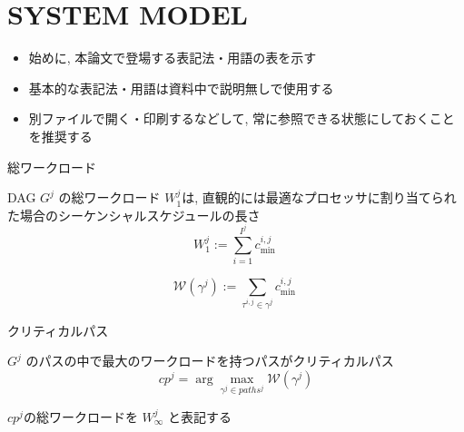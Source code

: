 
\section{SYSTEM MODEL}
\label{sec: SYSTEMMODEL}

\begin{frame}{}
    \begin{itemize}
        \item 始めに, 本論文で登場する表記法・用語の表を示す
        \item 基本的な表記法・用語は資料中で説明無しで使用する
        \item 別ファイルで開く・印刷するなどして, 常に参照できる状態にしておくことを推奨する
    \end{itemize}
\end{frame}



\begin{frame}{総ワークロード}
    \begin{definition}
        DAG $G^j$ の総ワークロード $W_1^j$は, 直観的には最適なプロセッサに割り当てられた場合のシーケンシャルスケジュールの長さ
        \begin{equation}
            W_1^j:=\sum_{i=1}^{I^j} c_{\text {min }}^{i, j}
        \end{equation}
    \end{definition}
    \begin{definition}
        \begin{equation}
            \mathcal{W}\left(\gamma^j\right):=\sum_{\tau^{i, j} \in \gamma^j} c_{\text {min }}^{i, j}
        \end{equation}
    \end{definition}
\end{frame}

\begin{frame}{クリティカルパス}
    \begin{definition}[$G^j$のクリティカルパス $cp^j$]
        $G^j$ のパスの中で最大のワークロードを持つパスがクリティカルパス
        \begin{equation}
            c p^j=\arg \max _{\gamma^j \in p a t h s^j} \mathcal{W}\left(\gamma^j\right)
        \end{equation}
    \end{definition}
    \vspace{5mm}
    $cp^j$の総ワークロードを $W_\infty^j$ と表記する
\end{frame}

